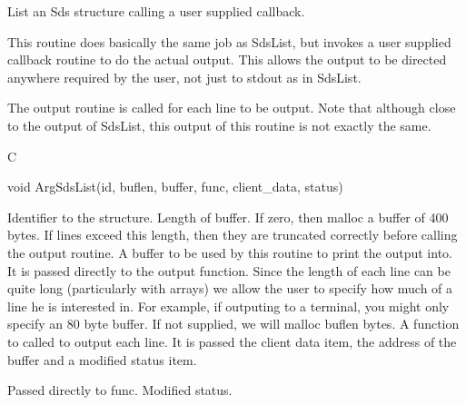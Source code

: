 \begin{manroutinedescription}
  	List an Sds structure calling a user supplied callback.

 	This routine does basically the same job as SdsList, but invokes
 	a user supplied callback routine to do the actual output.  This
 	allows the output to be directed anywhere required by the user,
 	not just to stdout as in SdsList.
 
 	The output routine is called for each line to be output.  Note that
 	although close to the output of SdsList, this output of this routine
 	is not exactly the same.
 
      C

      void ArgSdsList(id, buflen, buffer, func, client\_{}data, status)
 
\begin{manparametertable}
 Identifier to the structure.
 Length of buffer.  If %
zero, then malloc
      				a buffer of 400 bytes.  If lines exceed this
      				length, then they are truncated correctly
      				before calling the output routine.
	A buffer to be used %
by this routine to print
      				the output into.  It is passed directly to
      				the output function.   Since the length of
      				each line can be quite long (particularly
      				with arrays) we allow the user to specify
      				how much of a line he is interested in.  For
      				example, if outputing to a terminal, you might
      				only specify an 80 byte buffer.  If not
      				supplied, we will malloc buflen bytes.
 A function to called %
to output each
      				line.  It is passed the client data item,
      				the address of the buffer and a modified
      				status item.
 
 Passed %
directly to func.
 Modified status.

\end{manparametertable}
\end{manroutinedescription}
